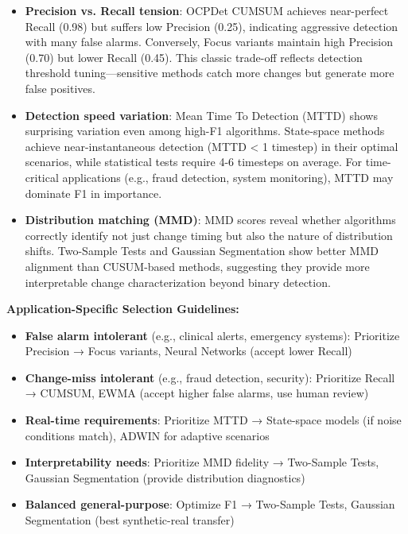 \documentclass[journal,article,submit,pdftex,moreauthors]{Definitions/mdpi}
\begin{document}
\begin{itemize}
    \item \textbf{Precision vs. Recall tension}: OCPDet CUMSUM achieves near-perfect Recall (0.98) but suffers low Precision (0.25), indicating aggressive detection with many false alarms. Conversely, Focus variants maintain high Precision (0.70) but lower Recall (0.45). This classic trade-off reflects detection threshold tuning—sensitive methods catch more changes but generate more false positives.
    
    \item \textbf{Detection speed variation}: Mean Time To Detection (MTTD) shows surprising variation even among high-F1 algorithms. State-space methods achieve near-instantaneous detection (MTTD < 1 timestep) in their optimal scenarios, while statistical tests require 4-6 timesteps on average. For time-critical applications (e.g., fraud detection, system monitoring), MTTD may dominate F1 in importance.
    
    \item \textbf{Distribution matching (MMD)}: MMD scores reveal whether algorithms correctly identify not just change timing but also the nature of distribution shifts. Two-Sample Tests and Gaussian Segmentation show better MMD alignment than CUSUM-based methods, suggesting they provide more interpretable change characterization beyond binary detection.
\end{itemize}

\textbf{Application-Specific Selection Guidelines:}

\begin{itemize}
    \item \textbf{False alarm intolerant} (e.g., clinical alerts, emergency systems): Prioritize Precision → Focus variants, Neural Networks (accept lower Recall)
    \item \textbf{Change-miss intolerant} (e.g., fraud detection, security): Prioritize Recall → CUMSUM, EWMA (accept higher false alarms, use human review)
    \item \textbf{Real-time requirements}: Prioritize MTTD → State-space models (if noise conditions match), ADWIN for adaptive scenarios
    \item \textbf{Interpretability needs}: Prioritize MMD fidelity → Two-Sample Tests, Gaussian Segmentation (provide distribution diagnostics)
    \item \textbf{Balanced general-purpose}: Optimize F1 → Two-Sample Tests, Gaussian Segmentation (best synthetic-real transfer)
\end{itemize}
\end{document}
